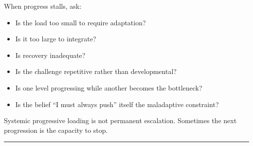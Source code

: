 When progress stalls, ask:

\begin{itemize}
\tightlist
\item
  Is the load too small to require adaptation?
\item
  Is it too large to integrate?
\item
  Is recovery inadequate?
\item
  Is the challenge repetitive rather than developmental?
\item
  Is one level progressing while another becomes the bottleneck?
\item
  Is the belief ``I must always push'' itself the maladaptive constraint?
\end{itemize}

Systemic progressive loading is not permanent escalation. Sometimes the next progression is the capacity to stop.

\begin{center}\rule{0.5\linewidth}{0.5pt}\end{center}

